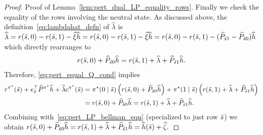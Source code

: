 \documentclass[mnsc,nonblindrev]{informs3}
\newcommand{\Phat}{\widehat{P}}
\newcommand{\pistar}{\pi^\star}
\newcommand{\hhat}{\widehat{h}}
\newcommand{\xihat}{\widehat{\xi}}
\newcommand{\zetahat}{\widehat{\zeta}}
\newcommand{\lambdahat}{\widehat{\lambda}}
\begin{document}
\begin{APPENDICES}
\begin{proof}{Proof of Lemma~\ref{lem:pert_dual_LP_equality_rows}.}
Finally we check the equality of the rows involving the neutral state. As discussed above, the definition~\eqref{eq:lambdahat_defn} of $\lambdahat$ is
$
    \lambdahat
    = r(\tilde{s},0) - r(\tilde{s},1) - \xihat \hhat = r(\tilde{s},0) - r(\tilde{s},1) - \xihat \hhat = r(\tilde{s},0) - r(\tilde{s},1) -(\Phat_{\Tilde{s}1} - \Phat_{\Tilde{s}0})\hhat
$
which directly rearranges to
\begin{align}
    r(\tilde{s},0) + \Phat_{\Tilde{s}0} \hhat = r(\tilde{s},1) + \lambdahat + \Phat_{\Tilde{s}1} \hhat. 
    \label{eq:pert_equal_Q_cond}
\end{align}
Therefore, \eqref{eq:pert_equal_Q_cond} implies
\begin{align*}
    r^{\pistar}(\Tilde{s}) + e_{\Tilde{s}}^\top\Phat^{ \pistar} \hhat + \lambdahat c^{\pistar}(\Tilde{s}) &= \pistar(0 \mid \Tilde{s})\left(r(\tilde{s},0) + \Phat_{\Tilde{s}0} \hhat\right) + \pistar(1 \mid \Tilde{s})\left(r(\tilde{s},1) + \lambdahat + \Phat_{\Tilde{s}1} \hhat\right)\\
    &= r(\tilde{s},0) + \Phat_{\Tilde{s}0} \hhat = r(\tilde{s},1) + \lambdahat + \Phat_{\Tilde{s}1} \hhat.
\end{align*}
Combining with~\eqref{eq:pert_LP_bellman_eqn} (specialized to just row $\Tilde{s}$) we obtain
$
    r(\tilde{s},0) + \Phat_{\Tilde{s}0} \hhat  = r(\tilde{s},1) + \lambdahat + \Phat_{\Tilde{s}1} \hhat = \hhat(\Tilde{s})+\zetahat.
$
\end{proof}



\end{APPENDICES}
\end{document}
